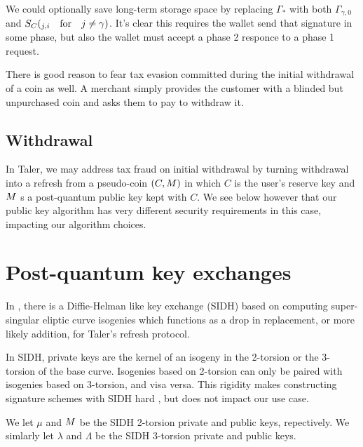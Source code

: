 \documentclass{llncs}
\begin{document}
We could optionally save long-term storage space by
replacing $\Gamma_*$ with both $\Gamma_{\gamma,0}$ and
 $S_C(_{j,i} \quad\textrm{for}\quad j \ne \gamma )$.
It's clear this requires the wallet send that signature in some phase,
but also the wallet must accept a phase 2 responce to a phase 1 request.

\smallskip

There is good reason to fear tax evasion committed during the
initial withdrawal of a coin as well.  A merchant simply provides
the customer with a blinded but unpurchased coin and asks them to
pay to withdraw it.

\subsection{Withdrawal}\label{subsec:withdrawal}

In Taler, we may address tax fraud on initial withdrawal by turning
withdrawal into a refresh from a pseudo-coin $(C,M)$ in which 
 $C$ is the user's reserve key \cite[??]{Taler} and
 $M$ s a post-quantum public key kept with $C$.
We see below however that our public key algorithm has very different
security requirements in this case, impacting our algorithm choices.


\section{Post-quantum key exchanges}


In \cite{SIDH?,SIDH16}, there is a Diffie-Helman like key exchange
(SIDH) based on computing super-singular eliptic curve isogenies 
which functions as a drop in replacement, or more likely addition,
for Taler's refresh protocol.

In SIDH, private keys are the kernel of an isogeny in the 2-torsion
or the 3-torsion of the base curve.  Isogenies based on 2-torsion can
only be paired with isogenies based on 3-torsion, and visa versa.  
This rigidity makes constructing signature schemes with SIDH hard
\cite{??SIDHsig??}, but does not impact our use case.  

We let $\mu$ and $M$ be the SIDH 2-torsion private and public keys,
repectively.  We simlarly let $\lambda$ and $\Lambda$ be the
SIDH 3-torsion private and public keys.  
\end{document}

